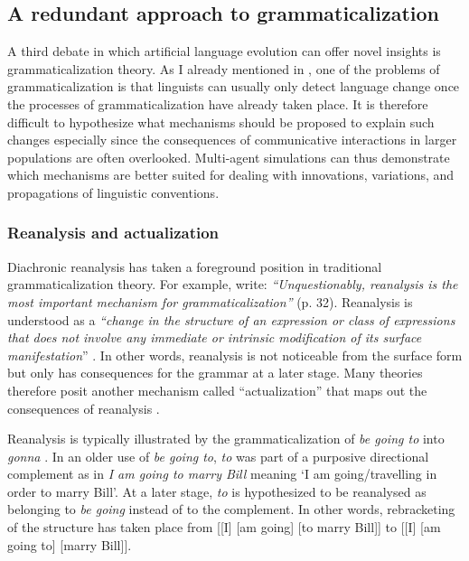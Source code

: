 \subsection{A redundant approach to grammaticalization}
\label{s:actualization}

A third debate in which artificial language evolution can offer novel insights is grammaticalization theory. As I already mentioned in , one of the problems of grammaticalization is that linguists can usually only detect language change once the processes of grammaticalization have already taken place. It is therefore difficult to hypothesize what mechanisms should be proposed to explain such changes especially since the consequences of communicative interactions in larger populations are often overlooked. Multi-agent simulations can thus demonstrate which mechanisms are better suited for dealing with innovations, variations, and propagations of linguistic conventions.


\subsubsection{Reanalysis and actualization} 
Diachronic reanalysis has taken a foreground position in traditional grammaticalization theory. For example, \citet{hopper93grammaticalization} write: {\em ``Unquestionably, reanalysis is the most important mechanism for grammaticalization''} (p. 32). Reanalysis is understood as a {\em ``change in the structure of an expression or class of expressions that does not involve any immediate or intrinsic modification of its surface manifestation}'' \citep[p. 59]{langacker77syntactic}. In other words, reanalysis is not noticeable from the surface form but only has consequences for the grammar at a later stage. Many theories therefore posit another mechanism called ``actualization'' that maps out the consequences of reanalysis \citep{timberlake77reanalysis}.

Reanalysis is typically illustrated by the grammaticalization of {\em be going to} into {\em gonna} \citep[p. 2--4]{hopper93grammaticalization}. In an older use of {\em be going to}, {\em to} was part of a purposive directional complement as in {\em I am going to marry Bill} meaning `I am going/travelling in order to marry Bill'. At a later stage, {\em to} is hypothesized to be reanalysed as belonging to {\em be going} instead of to the complement. In other words, rebracketing of the structure has taken place from [[I] [am going] [to marry Bill]] to [[I] [am going to] [marry Bill]].

